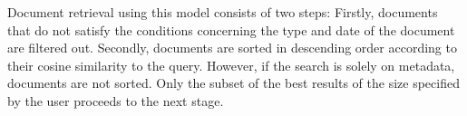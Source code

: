 Document retrieval using this model consists of two steps: Firstly, documents that do not satisfy the conditions concerning the type and date of the document are filtered out. Secondly, documents are sorted in descending order according to their cosine similarity to the query. However, if the search is solely on metadata, documents are not sorted. Only the subset of the best results of the size specified by the user proceeds to the next stage.

